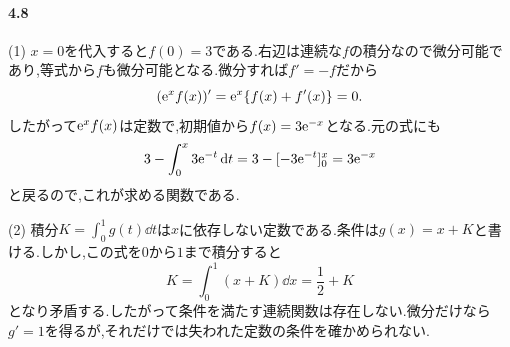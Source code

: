 \paragraph{4.8}
(1) $x=0$を代入すると$f(0)=3$である.右辺は連続な$f$の積分なので微分可能であり,等式から$f$も微分可能となる.微分すれば$f'=-f$だから
\[
 (\mathrm{e}^xf(x))'=\mathrm{e}^x\{f(x)+f'(x)\}=0.
\]
したがって$\mathrm{e}^xf(x)$は定数で,初期値から$f(x)=3\mathrm{e}^{-x}$となる.元の式にも
\[
 3-\int_0^x3\mathrm{e}^{-t}\,\mathrm{d} t
 =3-[-3\mathrm{e}^{-t}]_0^x=3\mathrm{e}^{-x}
\]
と戻るので,これが求める関数である.

(2) 積分$K=\int_0^1g(t)\dd t$は$x$に依存しない定数である.条件は$g(x)=x+K$と書ける.しかし,この式を$0$から$1$まで積分すると
\[
 K=\int_0^1(x+K)\dd x=\frac12+K
\]
となり矛盾する.したがって条件を満たす連続関数は存在しない.微分だけなら$g'=1$を得るが,それだけでは失われた定数の条件を確かめられない.
